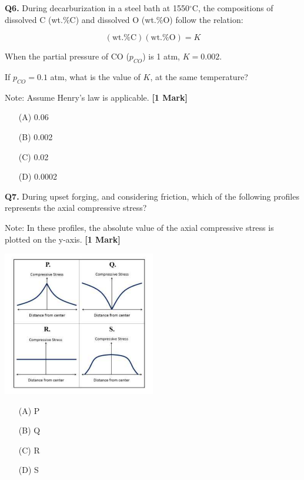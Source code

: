 \documentclass[11pt]{article}
\newcommand{\questiona}[2]{
    \noindent\textbf{Q#2.} #1 \hfill \textbf{[1 Mark]}
}
\begin{document}
\questiona{During decarburization in a steel bath at 1550\(^\circ\)C, the compositions of dissolved C (wt.\%C) and dissolved O (wt.\%O) follow the relation:  

\[(\text{wt.\%C})(\text{wt.\%O}) = K\]

When the partial pressure of CO (\(p_{CO}\)) is 1 atm, \(K = 0.002\).  

If \(p_{CO} = 0.1\) atm, what is the value of \(K\), at the same temperature?  

Note: Assume Henry’s law is applicable.}{6}
\begin{enumerate}
    \item[(A)] 0.06  
    \item[(B)] 0.002  
    \item[(C)] 0.02  
    \item[(D)] 0.0002  
\end{enumerate}
\vspace{0.5cm}

\questiona{During upset forging, and considering friction, which of the following profiles represents the axial compressive stress?

Note: In these profiles, the absolute value of the axial compressive stress is plotted on the y-axis.}{7}
\begin{center}
\includegraphics[width=0.5\textwidth]{figures/7.png}
\end{center}
\begin{enumerate}
    \item[(A)] P  
    \item[(B)] Q  
    \item[(C)] R  
    \item[(D)] S  
\end{enumerate}
\vspace{0.5cm}
\end{document}
